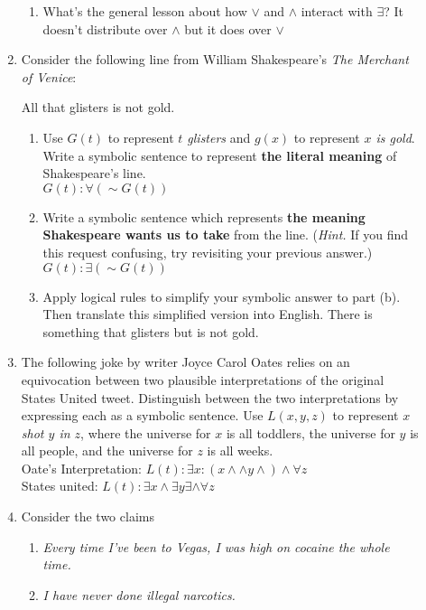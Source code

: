 \documentclass{letter}
\theoremstyle{definition}
\begin{document}
\begin{description}
\begin{enumerate}
\begin{enumerate}
			\item What's the general lesson about how $\vee$ and $\wedge$ interact with $\exists$? It doesn't distribute over $\wedge$ but it does over $\vee$
		\end{enumerate}
		\item Consider the following line from William Shakespeare's {\em The Merchant of Venice}:
			\begin{center}{All that glisters is not gold.}\end{center}
			\begin{enumerate}
				\item Use $G(t)$ to represent {\em $t$ glisters} and $g(x)$ to represent {\em $x$ is gold}. Write a symbolic sentence to represent {\bfseries the literal meaning} of Shakespeare's line. \\ $G(t): \forall (\sim G(t))$
				\item Write a symbolic sentence which represents {\bfseries the meaning Shakespeare wants us to take} from the line. ({\em Hint.} If you find this request confusing, try revisiting your previous answer.)\\ $G(t): \exists (\sim G(t))$
				\item Apply logical rules to simplify your symbolic answer to part (b). Then translate this simplified version into English. There is something that glisters but is not gold.\\
			\end{enumerate}
		\item The following joke by writer Joyce Carol Oates relies on an equivocation between two plausible interpretations of the original States United tweet. Distinguish between the two interpretations by expressing each as a symbolic sentence. Use $L(x,y,z)$ to represent {\em $x$ shot $y$ in $z$}, where the universe for $x$ is all toddlers, the universe for $y$ is all people, and the universe for $z$ is all weeks. \\
Oate's Interpretation: $L(t): \exists x: ( x \wedge \wedge y \wedge) \wedge \forall z$ \\
States united: $L(t): \exists x \wedge \exists y \exists \wedge \forall z $
		\item Consider the two claims
			\begin{enumerate}[(1)]
				\item {\em Every time I've been to Vegas, I was high on cocaine the whole time.}
				\item {\em I have never done illegal narcotics.}
			\end{enumerate}

\end{enumerate}
\end{description}
\end{document}
